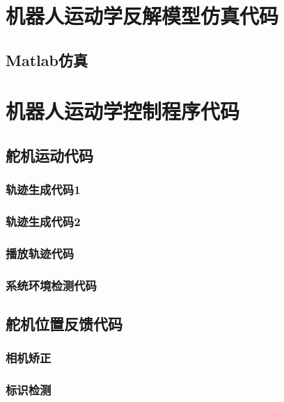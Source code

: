 \section{机器人运动学反解模型仿真代码}
\subsection{Matlab仿真}

\section{机器人运动学控制程序代码}
\subsection{舵机运动代码}
\subsubsection{轨迹生成代码1}

\subsubsection{轨迹生成代码2}

\subsubsection{播放轨迹代码}

\subsubsection{系统环境检测代码}

\subsection{舵机位置反馈代码}
\subsubsection{相机矫正}

\subsubsection{标识检测}


